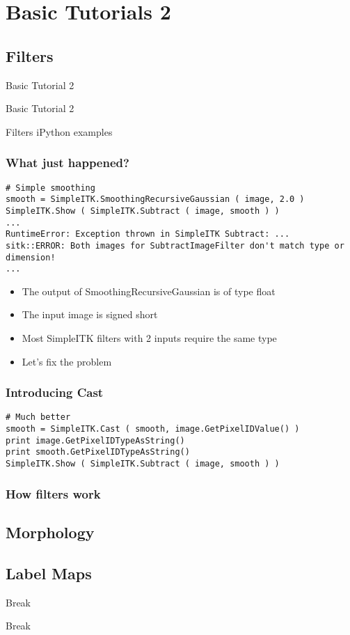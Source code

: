 \section{Basic Tutorials 2}

\subsection{Filters}

\begin{frame}{Basic Tutorial 2}
\fontsize{36pt}{36pt}\selectfont
\center
\begin{center}
Basic Tutorial 2
\end{center}
\end{frame}


\begin{frame}{Filters}
iPython examples
\end{frame}

\begin{frame}[fragile]
\frametitle{What just happened?}
\lstpython
\begin{lstlisting}
# Simple smoothing
smooth = SimpleITK.SmoothingRecursiveGaussian ( image, 2.0 )
SimpleITK.Show ( SimpleITK.Subtract ( image, smooth ) )
...
RuntimeError: Exception thrown in SimpleITK Subtract: ...
sitk::ERROR: Both images for SubtractImageFilter don't match type or dimension!
...
\end{lstlisting}

\begin{itemize}
  \item The output of SmoothingRecursiveGaussian is of type float
  \item The input image is signed short
  \item Most SimpleITK filters with 2 inputs require the same type
  \item Let's fix the problem
\end{itemize}

\end{frame}



\begin{frame}[fragile]
\frametitle{Introducing Cast}
\lstpython
\begin{lstlisting}
# Much better
smooth = SimpleITK.Cast ( smooth, image.GetPixelIDValue() )
print image.GetPixelIDTypeAsString()
print smooth.GetPixelIDTypeAsString()
SimpleITK.Show ( SimpleITK.Subtract ( image, smooth ) )
\end{lstlisting}
\end{frame}

\begin{frame}
\frametitle{How filters work}
\end{frame}

\subsection{Morphology}

\subsection{Label Maps}

\begin{frame}{Break}
\fontsize{36pt}{36pt}\selectfont
\center
\begin{center}
Break
\end{center}
\end{frame}

